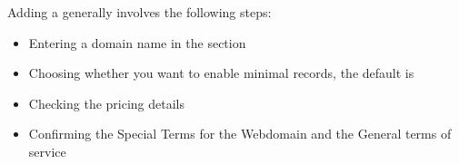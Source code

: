 \documentclass[a4paper,10pt,english,openany,oneside]{sphinxmanual}
\begin{document}
\sphinxAtStartPar
Adding a  generally involves the following steps:
\begin{itemize}
\item {} 
\sphinxAtStartPar
Entering a domain name in the  section

\item {} 
\sphinxAtStartPar
Choosing whether you want to enable minimal records, the default is 

\item {} 
\sphinxAtStartPar
Checking the pricing details

\item {} 
\sphinxAtStartPar
Confirming the Special Terms for the Webdomain and the General terms of service

\end{itemize}
\end{document}
